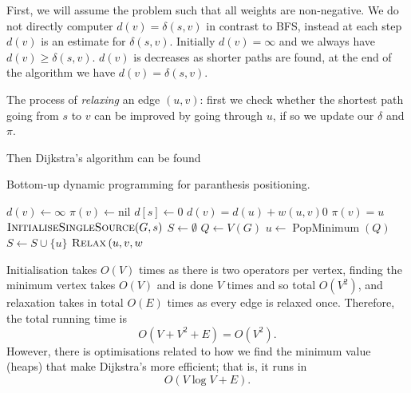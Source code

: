 First, we will assume the problem such that all weights are non-negative.
We do not directly computer $d(v) = \delta(s, v)$ in contrast to BFS,
instead at each step $d(v)$ is an estimate for $\delta(s, v)$.
Initially $d(v) = \infty$ and we always have $d(v) \geq \delta(s, v)$.
$d(v)$ is decreases as shorter paths are found, at the end of the algorithm we
have $d(v) = \delta(s, v)$.

The process of \emph{relaxing} an edge $(u, v)$: 
first we check whether the shortest path going from $s$ to $v$ can be 
improved by going through $u$, 
if so we update our $\delta$ and $\pi$.

Then Dijkstra's algorithm can be found

\begin{algorithm}
    Bottom-up dynamic programming for paranthesis positioning.
    \begin{algorithmic}[1]
                \State $d(v) \gets \infty$
                \State $\pi(v) \gets \text{nil}$
            \EndFor
            \State $d[s] \gets 0$
        \EndProcedure
                \State $d(v) = d(u) + w(u, v)0$
                \State $\pi(v) = u$
            \EndIf
        \EndProcedure
            \State $\text{\textsc{InitialiseSingleSource}}(G, s)$
            \State $S \gets \emptyset$
            \State $Q \gets V(G)$
                \State $u \gets \operatorname{PopMinimum}(Q)$
                \State $S \gets S \cup \{u\}$
                    \State $\operatorname{\textsc{Relax}}{(u, v, w}$
                \EndFor
            \EndWhile
        \EndProcedure
    \end{algorithmic}
\end{algorithm}

Initialisation takes $O(V)$ times as there is two operators per vertex,
finding the minimum vertex takes $O(V)$ and is done $V$ times and so
total $O(V^2)$, and relaxation takes in total $O(E)$ times as every
edge is relaxed once. Therefore, the total running time is
\[ O(V + V^2 + E) = O(V^2). \]
However, there is optimisations related to how we find the minimum
value (heaps) that make Dijkstra's more efficient; that is, it runs in
\[ O(V\log V + E). \]

